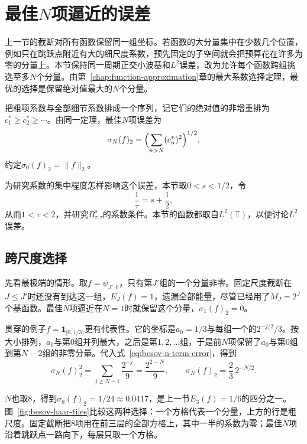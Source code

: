\section{最佳\texorpdfstring{$N$}{N}项逼近的误差}
\label{sec:besov-best-n-term}

上一节的截断对所有函数保留同一组坐标。若函数的大分量集中在少数几个位置，例如只在跳跃点附近有大的细尺度系数，预先固定的子空间就会把预算花在许多为零的分量上。本节保持同一周期正交小波基和$L^2$误差，改为允许每个函数跨组挑选至多$N$个分量。由第~\ref{chap:function-approximation}章的最大系数选择定理，最优的选择是保留绝对值最大的$N$个分量。

把粗项系数与全部细节系数排成一个序列，记它们的绝对值的非增重排为$c_1^*\geq c_2^*\geq\cdots$。由同一定理，最佳$N$项误差为
\begin{equation}
 \sigma_N(f)_2=\Bigl(\sum_{n>N}(c_n^*)^2\Bigr)^{1/2},
 \label{eq:besov-n-term-error}
\end{equation}
约定$\sigma_0(f)_2=\lVert f\rVert_2$。

为研究系数的集中程度怎样影响这个误差，本节取$0<s<1/2$，令
\begin{equation}
 \frac1\tau=s+\frac12,
 \label{eq:besov-tau}
\end{equation}
从而$1<\tau<2$，并研究$B^s_{\tau,\tau}$的系数条件。本节的函数都取自$L^2(\mathbb T)$，以便讨论$L^2$误差。

\subsection{跨尺度选择}
\label{sec:besov-adaptive-selection}

先看最极端的情形。取$f=\psi_{J',0}$，只有第$J'$组的一个分量非零。固定尺度截断在$J\leq J'$时还没有到达这一组，$E_J(f)=1$，遗漏全部能量，尽管已经用了$M_J=2^J$个基函数。最佳$N$项逼近在$N=1$时就保留这个分量，$\sigma_1(f)_2=0$。

贯穿的例子$f=\mathbf 1_{[0,1/3)}$更有代表性。它的坐标是$a_0=1/3$与每组一个的$2^{-j/2}/3$。按大小排列，$a_0$与第$0$组并列最大，之后是第$1,2,\ldots$组，于是前$N$项保留了$a_0$与第$0$组到第$N-2$组的非零分量。代入式~\eqref{eq:besov-n-term-error}，得到
\[
 \sigma_N(f)_2^2=\sum_{j\geq N-1}\frac{2^{-j}}{9}=\frac{2^{2-N}}{9},\qquad\sigma_N(f)_2=\frac23\,2^{-N/2}.
\]

$N$也取$8$，得到$\sigma_8(f)_2=1/24\approx0.0417$，是上一节$E_3(f)=1/6$的四分之一。图~\ref{fig:besov-haar-tiles}比较这两种选择：一个方格代表一个分量，上方的行是粗尺度。固定截断把$8$项用在前三层的全部方格上，其中一半的系数为零；最佳$N$项沿着跳跃点一路向下，每层只取一个方格。


